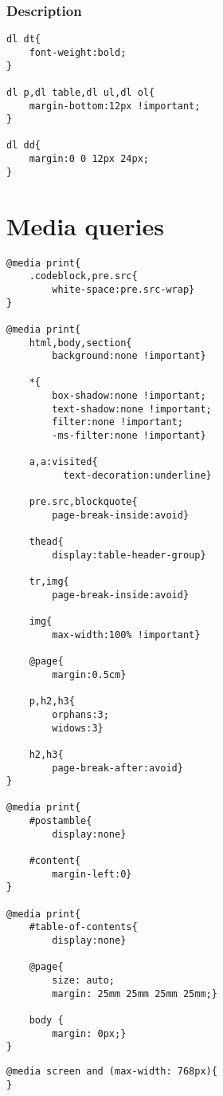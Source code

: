 \documentclass[11pt]{article}
\begin{document}
\subsubsection{Description}
\label{sec:org27648e7}

\begin{verbatim}
dl dt{
    font-weight:bold;
}

dl p,dl table,dl ul,dl ol{
    margin-bottom:12px !important;
}

dl dd{
    margin:0 0 12px 24px;
}
\end{verbatim}

\section{Media queries}
\label{sec:orgd22d720}
\begin{verbatim}
@media print{
    .codeblock,pre.src{
        white-space:pre.src-wrap}
}

@media print{
    html,body,section{
        background:none !important}

    *{
        box-shadow:none !important;
        text-shadow:none !important;
        filter:none !important;
        -ms-filter:none !important}

    a,a:visited{
          text-decoration:underline}

    pre.src,blockquote{
        page-break-inside:avoid}

    thead{
        display:table-header-group}

    tr,img{
        page-break-inside:avoid}

    img{
        max-width:100% !important}

    @page{
        margin:0.5cm}

    p,h2,h3{
        orphans:3;
        widows:3}

    h2,h3{
        page-break-after:avoid}
}

@media print{
    #postamble{
        display:none}

    #content{
        margin-left:0}
}

@media print{
    #table-of-contents{
        display:none}

    @page{
        size: auto;
        margin: 25mm 25mm 25mm 25mm;}

    body {
        margin: 0px;}
}
\end{verbatim}

\begin{verbatim}
@media screen and (max-width: 768px){
}
\end{verbatim}
\end{document}
